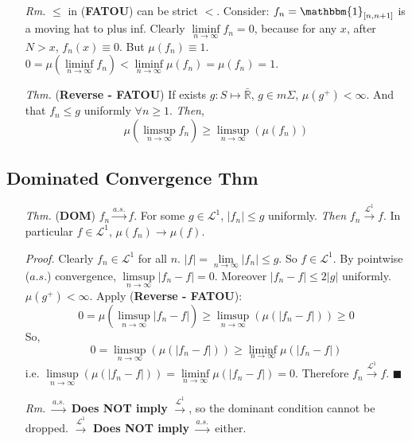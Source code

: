 \documentclass[a4paper,12pt,twoside]{book}
\begin{document}
\begin{itemize}
	\item[\textit{Rm.}] $\leq$ in (\textbf{FATOU}) can be strict $<$. Consider: $f_n = \mathbbm{1}_{[n, n+1]}$ is a moving hat to plus inf. Clearly $\liminf\limits_{n\rightarrow\infty}f_n=0$, because for any $x$, after $N>x$, $f_n(x)\equiv0$. But $\mu(f_n)\equiv1$. $0=\mu(\liminf\limits_{n\rightarrow\infty}f_n)<\liminf\limits_{n\rightarrow\infty}\mu(f_n)=\mu(f_n)=1$.

	\item[\textit{Thm.}] (\textbf{Reverse - FATOU}) If exists $g: S\mapsto \bar{\mathbb{R}}$, $g\in m\Sigma$, $\mu(g^+)< \infty$. And that $f_n\leq g$ uniformly $\forall n\geq 1$. \textit{Then},
	\begin{equation}
	 	\mu(\limsup\limits_{n\rightarrow\infty}f_n)\geq \limsup\limits_{n\rightarrow\infty}(\mu(f_n))
	\end{equation} 
\end{itemize}

\subsection{Dominated Convergence Thm}
\begin{itemize}
	\item[\textit{Thm.}] (\textbf{DOM}) $f_n \xrightarrow{a.s.} f$. For some $g\in \mathcal{L}^1$, $|f_n|\leq g$ uniformly. \textit{Then} $f_n \xrightarrow{\mathcal{L}^1} f$. \newline
	In particular $f\in \mathcal{L}^1$, $\mu(f_n)\to \mu(f)$.

	\item[\textit{Proof.}] Clearly $f_n \in \mathcal{L}^1$ for all $n$. \newline
	$|f|=\lim\limits_{n\rightarrow\infty}|f_n|\leq g$. So $f\in \mathcal{L}^1$.\newline
	By pointwise ($a.s.$) convergence, $\limsup\limits_{n\rightarrow\infty}|f_n-f|=0$. \newline
	Moreover $|f_n-f|\leq 2|g|$ uniformly. $\mu(g^+)<\infty$. Apply (\textbf{Reverse - FATOU}):
	\begin{equation}
		0=\mu(\limsup\limits_{n\rightarrow\infty}|f_n-f|)\geq \limsup\limits_{n\rightarrow\infty}(\mu(|f_n-f|))\geq 0
	\end{equation}
	So,
	\begin{equation}
		0=\limsup\limits_{n\rightarrow\infty}(\mu(|f_n-f|))\geq \liminf\limits_{n\rightarrow\infty}\mu(|f_n-f|)
	\end{equation}
	i.e. $\limsup\limits_{n\rightarrow\infty}(\mu(|f_n-f|))= \liminf\limits_{n\rightarrow\infty}\mu(|f_n-f|)=0$. Therefore $f_n \xrightarrow{\mathcal{L}^1} f$. $\blacksquare$

	\item[\textit{Rm.}] $\xrightarrow{a.s.}$ \textbf{Does NOT imply} $\xrightarrow{\mathcal{L}^1}$, so the dominant condition cannot be dropped. $\xrightarrow{\mathcal{L}^1}$ \textbf{Does NOT imply} $\xrightarrow{a.s.}$ either. 
\end{itemize}
\end{document}
